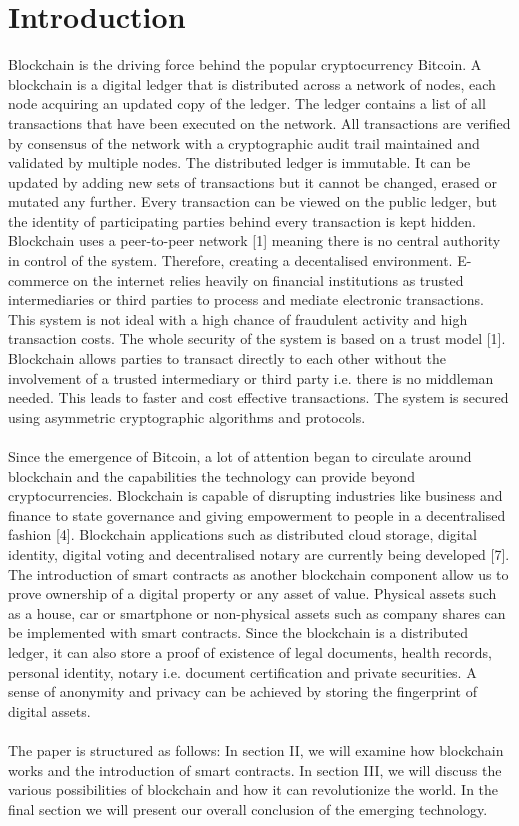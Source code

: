 \documentclass[report]{IEEEtran}
\begin{document}
\section{Introduction}
Blockchain is the driving force behind the popular cryptocurrency Bitcoin. A blockchain is a digital ledger that is distributed across a network of nodes, each node acquiring an updated copy of the ledger. The ledger contains a list of all transactions that have been executed on the network. All transactions are verified by consensus of the network with a cryptographic audit trail maintained and validated by multiple nodes. The distributed ledger is immutable. It can be updated by adding new sets of transactions but it cannot be changed, erased or mutated any further. Every transaction can be viewed on the public ledger, but the identity of participating parties behind every transaction is kept hidden. Blockchain uses a peer-to-peer network [1] meaning there is no central authority in control of the system. Therefore, creating a decentalised environment. E-commerce on the internet relies heavily on financial institutions as trusted intermediaries or third parties to process and mediate electronic transactions. This system is not ideal with a high chance of fraudulent activity and high transaction costs. The whole security of the system is based on a trust model [1]. Blockchain allows parties to transact directly to each other without the involvement of a trusted intermediary or third party i.e. there is no middleman needed. This leads to faster and cost effective transactions. The system is secured using asymmetric cryptographic algorithms and protocols.
\\\\ Since the emergence of Bitcoin, a lot of attention began to circulate around blockchain and the capabilities the technology can provide beyond cryptocurrencies. Blockchain is capable of disrupting industries like business and finance to state governance and giving empowerment to people in a decentralised fashion [4]. Blockchain applications such as distributed cloud storage, digital identity, digital voting and decentralised notary are currently being developed [7]. The introduction of smart contracts as another blockchain component allow us to prove ownership of a digital property or any asset of value. Physical assets such as a house, car or smartphone or non-physical assets such as company shares can be implemented with smart contracts. Since the blockchain is a distributed ledger, it can also store a proof of existence of legal documents, health records, personal identity, notary i.e. document certification and private securities. A sense of anonymity and privacy can be achieved by storing the fingerprint of digital assets. 
\\\\ The paper is structured as follows: In section II, we will examine how blockchain works and the introduction of smart contracts. In section III, we will discuss the various possibilities of blockchain and how it can revolutionize the world. In the final section we will present our overall conclusion of the emerging technology.
\end{document}
